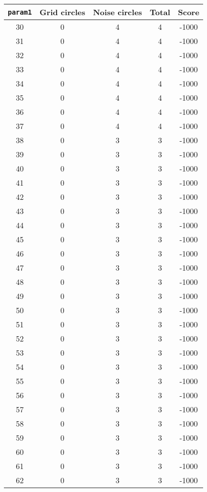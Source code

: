 \documentclass[letterpaper, 12pt]{article}
\begin{document}
\begin{longtable}{|c|c|c|c|c|}
\hline
\textbf{\texttt{param1}} & \textbf{Grid circles} & \textbf{Noise circles} & \textbf{Total} & \textbf{Score} \\
\hline
30 & 0 & 4 & 4 & -1000 \\
\hline
31 & 0 & 4 & 4 & -1000 \\
\hline
32 & 0 & 4 & 4 & -1000 \\
\hline
33 & 0 & 4 & 4 & -1000 \\
\hline
34 & 0 & 4 & 4 & -1000 \\
\hline
35 & 0 & 4 & 4 & -1000 \\
\hline
36 & 0 & 4 & 4 & -1000 \\
\hline
37 & 0 & 4 & 4 & -1000 \\
\hline
38 & 0 & 3 & 3 & -1000 \\
\hline
39 & 0 & 3 & 3 & -1000 \\
\hline
40 & 0 & 3 & 3 & -1000 \\
\hline
41 & 0 & 3 & 3 & -1000 \\
\hline
42 & 0 & 3 & 3 & -1000 \\
\hline
43 & 0 & 3 & 3 & -1000 \\
\hline
44 & 0 & 3 & 3 & -1000 \\
\hline
45 & 0 & 3 & 3 & -1000 \\
\hline
46 & 0 & 3 & 3 & -1000 \\
\hline
47 & 0 & 3 & 3 & -1000 \\
\hline
48 & 0 & 3 & 3 & -1000 \\
\hline
49 & 0 & 3 & 3 & -1000 \\
\hline
50 & 0 & 3 & 3 & -1000 \\
\hline
51 & 0 & 3 & 3 & -1000 \\
\hline
52 & 0 & 3 & 3 & -1000 \\
\hline
53 & 0 & 3 & 3 & -1000 \\
\hline
54 & 0 & 3 & 3 & -1000 \\
\hline
55 & 0 & 3 & 3 & -1000 \\
\hline
56 & 0 & 3 & 3 & -1000 \\
\hline
57 & 0 & 3 & 3 & -1000 \\
\hline
58 & 0 & 3 & 3 & -1000 \\
\hline
59 & 0 & 3 & 3 & -1000 \\
\hline
60 & 0 & 3 & 3 & -1000 \\
\hline
61 & 0 & 3 & 3 & -1000 \\
\hline
62 & 0 & 3 & 3 & -1000 \\

\end{longtable}
\end{document}
